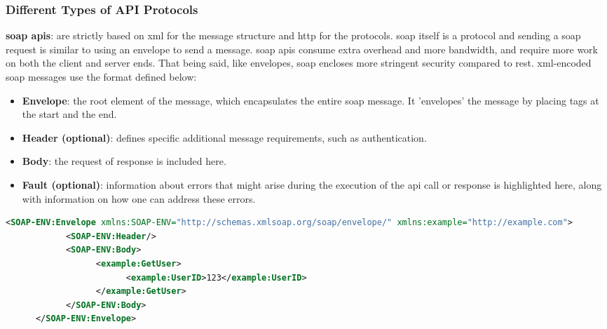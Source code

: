 \begin{multicols}{2}
      \subsubsection{Different Types of API Protocols}\label{chap:typesofapis}
      \textbf{\acrshort{soap} \acrshort{api}s}: are strictly based on \acrshort{xml} for the message structure and
      \acrshort{http} for the protocols. \acrshort{soap} itself is a protocol and sending a \acrshort{soap}
      request is similar to using an envelope to send a message. \acrshort{soap} \acrshort{api}s consume extra
      overhead and more bandwidth, and require more work on both the client and server ends. That being said,
      like envelopes, \acrshort{soap} encloses more stringent security compared to \acrshort{rest}. \acrshort{xml}-encoded
      \acrshort{soap} messages use the format defined below:
      \begin{itemize}
            \item \textbf{Envelope}: the root element of the message, which encapsulates the entire
                  \acrshort{soap} message. It 'envelopes' the message by placing tags at the start and the end.
            \item \textbf{Header (optional)}: defines specific additional message requirements, such as authentication.
            \item \textbf{Body}: the request of response is included here.
            \item \textbf{Fault (optional)}: information about errors that might arise during the execution of the
                  \acrshort{api} call or response is highlighted here, along with information on how one can address
                  these errors.
      \end{itemize}
\end{multicols}

\begin{lstlisting}[language=XML, caption=Example of a SOAP request, label=lst:soaprequest]
      <SOAP-ENV:Envelope xmlns:SOAP-ENV="http://schemas.xmlsoap.org/soap/envelope/" xmlns:example="http://example.com">
            <SOAP-ENV:Header/>
            <SOAP-ENV:Body>
                  <example:GetUser>
                        <example:UserID>123</example:UserID>
                  </example:GetUser>
            </SOAP-ENV:Body>
      </SOAP-ENV:Envelope>
\end{lstlisting}


